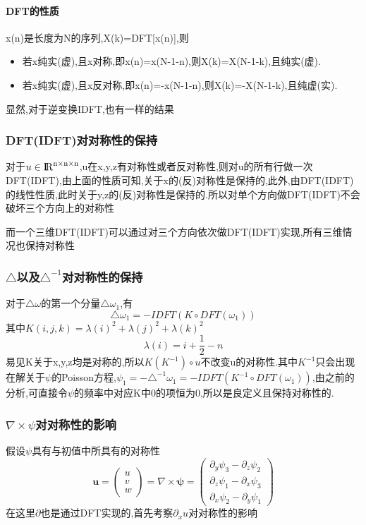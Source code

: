 \documentclass[UTF8]{ctexart}
\begin{document}
\paragraph{DFT的性质}
x(n)是长度为N的序列,X(k)=DFT[x(n)],则
\begin{itemize}
  \item 若x纯实(虚),且x对称,即x(n)=x(N-1-n),则X(k)=X(N-1-k),且纯实(虚).
  \item 若x纯实(虚),且x反对称,即x(n)=-x(N-1-n),则X(k)=-X(N-1-k),且纯虚(实).
\end{itemize}
显然,对于逆变换IDFT,也有一样的结果

\subsubsection{DFT(IDFT)对对称性的保持}
对于$u\in \rm{I\!R}^{n \times n \times n}$,u在x,y,z有对称性或者反对称性,则对u的所有行做一次DFT(IDFT),由上面的性质可知,关于x的(反)对称性是保持的,此外,由DFT(IDFT)的线性性质,此时关于y,z的(反)对称性是保持的.所以对单个方向做DFT(IDFT)不会破坏三个方向上的对称性

而一个三维DFT(IDFT)可以通过对三个方向依次做DFT(IDFT)实现,所有三维情况也保持对称性
\subsubsection{$\triangle$以及$\triangle^{-1}$对对称性的保持}
对于$\triangle \omega$的第一个分量$\triangle \omega_1$,有
$$
\triangle \omega_1 = -IDFT( K \circ DFT(\omega_1))
$$
其中$K(i,j,k)= \lambda(i)^2+\lambda(j)^2+\lambda(k)^2$
\begin{equation*}
  \lambda(i)= i+\frac{1}{2}-n
\end{equation*}
易见K关于x,y,z均是对称的,所以$K(K^{-1})\circ u$不改变u的对称性.其中$K^{-1}$只会出现在解关于$\psi$的Poisson方程,$\psi_1=-\triangle^{-1}\omega_1=-IDFT( K^{-1} \circ DFT(\omega_1))$,由之前的分析,可直接令$\psi$的频率中对应K中0的项恒为0,所以是良定义且保持对称性的.

\subsubsection{$\nabla \times \psi$对对称性的影响}
假设$\psi$具有与初值中所具有的对称性
\begin{equation*}
\mathbf{u} = \left(\begin{matrix}
                          u \\
                          v \\
                          w
                        \end{matrix}\right) =\nabla \times \mathbf{\psi}
                        =\left(\begin{matrix}
                          \partial_y \psi_3 -\partial_z \psi_2 \\
                          \partial_z \psi_1 -\partial_x \psi_3 \\
                          \partial_x \psi_2 -\partial_y \psi_1
                        \end{matrix}\right)
\end{equation*}
在这里$\partial$也是通过DFT实现的,首先考察$\partial_x u$对对称性的影响
\end{document}
